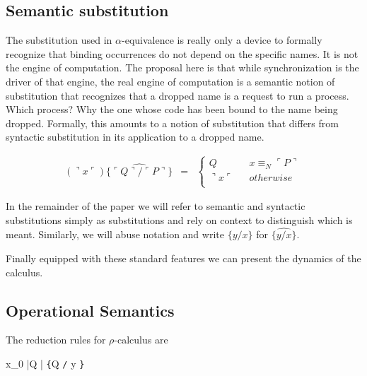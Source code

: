 \documentclass[]{amsart}
\newcommand{\lliftb}{\langle\!|}
\newcommand{\rliftb}{|\!\rangle}
\newcommand{\lpquote}{\ulcorner}
\newcommand{\rpquote}{\urcorner}
\newcommand{\id}[1]{\texttt{#1}}
\newcommand{\juxtap}{\mathbin{\id{|}}}
\newcommand{\concat}{\mathbin{.}}
\newcommand{\nameeq}{\mathbin{\equiv_N}}
\newcommand{\lift}[2]{#1 \lliftb #2 \rliftb}
\newcommand{\quotep}[1]{\lpquote #1 \rpquote}
\newcommand{\dropn}[1]{\rpquote #1 \lpquote}
\newcommand{\substp}[2]{\id{\{} \quotep{#1} / \quotep{#2} \id{\}}}
\newcommand{\substn}[2]{\id{\{} #1 / #2 \id{\}}}
\newcommand{\psubstp}[2]{\widehat{\substp{#1}{#2}}}
\newcommand{\psubstn}[2]{\widehat{\substn{#1}{#2}}}
\newcommand{\red}{\rightarrow}
\theoremstyle{definition}
\theoremstyle{remark}
\numberwithin{equation}{subsection}
\newcommand{\rhoc}{$\rho$-calculus}
\begin{document}
\subsection{Semantic substitution}

The substitution used in $\alpha$-equivalence is really only a device
to formally recognize that binding occurrences do not depend on the
specific names. It is not the engine of computation. The proposal here
is that while synchronization is the driver of that engine, the real
engine of computation is a semantic notion of substitution that
recognizes that a dropped name is a request to run a process. Which
process? Why the one whose code has been bound to the name being
dropped. Formally, this amounts to a notion of substitution that
differs from syntactic substitution in its application to a dropped
name.

\begin{eqnarray*}
(\dropn{x})  \psubstp{Q}{P}       
		& = & 
		\left\{ 
			\begin{array}{ccc} 
				Q & & x \nameeq \quotep{P} \\
                              	\dropn{x} & & otherwise \\
			\end{array}
		\right.
\end{eqnarray*}

In the remainder of the paper we will refer to semantic and syntactic
substitutions simply as substitutions and rely on context to
distinguish which is meant. Similarly, we will abuse notation and
write $\substn{y}{x}$ for $\psubstn{y}{x}$.

Finally equipped with these standard features we can present the
dynamics of the calculus.

\subsection{Operational Semantics}
The reduction rules for {\rhoc}  are


\infrule[Comm]
{ {x}_{0} \nameeq {x}_{1} }
{{\lift{x_{0}}{Q} \juxtap { x_{1} \id{(}{y} \id{)} \concat {P}}}
\red {P}\id{\{}\quotep{Q} \id{/} {y} \id{\}}}
\end{document}
